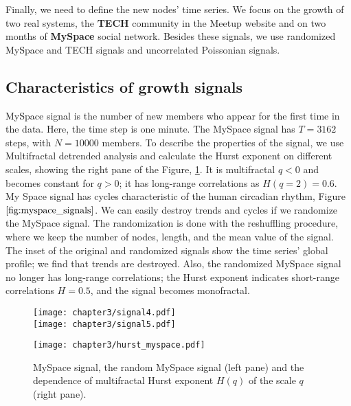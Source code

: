 Finally, we need to define the new nodes' time series. We focus on the growth of two real systems, the \textbf{TECH} \cite{smiljanic2017associative} community in the Meetup website and on two months of \textbf{MySpace} \cite{suvakov2013} social network. Besides these signals, we use randomized MySpace and TECH signals and uncorrelated Poissonian signals.  

\subsection{Characteristics of growth signals} %

MySpace signal is the number of new members who appear for the first time in the data. Here, the time step is one minute. The MySpace signal has $T = 3162$ steps, with  $N = 10000$ members. To describe the properties of the signal, we use Multifractal detrended analysis and calculate the Hurst exponent on different scales, showing the right pane of the Figure, \ref{fig:myspace_signals}. It is multifractal $q<0$ and becomes constant for $q>0$; it has long-range correlations as $H(q=2)=0.6$. My Space signal has cycles characteristic of the human circadian rhythm, Figure $\ref{fig:myspace_signals}$. We can easily destroy trends and cycles if we randomize the MySpace signal. The randomization is done with the reshuffling procedure, where we keep the number of nodes, length, and the mean value of the signal. The inset of the original and randomized signals show the time series' global profile; we find that trends are destroyed. Also, the randomized MySpace signal no longer has long-range correlations; the Hurst exponent indicates short-range correlations $H=0.5$, and the signal becomes monofractal.    


\begin{figure}[H]
	\centering
	\begin{minipage}[b]{0.4\textwidth}
		\centering
		\texttt{[image: chapter3/signal4.pdf]}\\
		\texttt{[image: chapter3/signal5.pdf]}
	\end{minipage}
	\begin{minipage}[b]{0.45\textwidth}
		\centering
		\texttt{[image: chapter3/hurst\_myspace.pdf]}
		\vspace{0.01cm}
	\end{minipage}
	\caption[Properties of MySpace signal.]{MySpace signal, the random MySpace signal (left pane) and the dependence of multifractal Hurst exponent $H(q)$ of the scale $q$ (right pane).}
	\label{fig:myspace_signals}
\end{figure}

